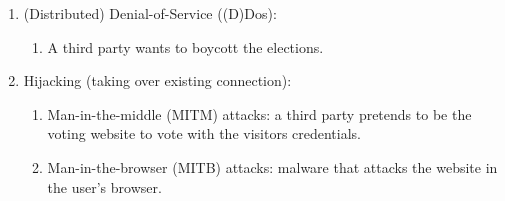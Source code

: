 \begin{itemize}
\begin{enumerate}
        \item (Distributed) Denial-of-Service ((D)Dos):
        \begin{enumerate}
            \item A third party wants to boycott the elections.
        \end{enumerate}
        
        \item Hijacking (taking over existing connection):
        \begin{enumerate}
            \item Man-in-the-middle (MITM) attacks: a third party pretends to be the voting website to vote with the visitors credentials.
            \item Man-in-the-browser (MITB) attacks: malware that attacks the website in the user's browser.
        \end{enumerate}
    \end{enumerate}
\end{itemize}
